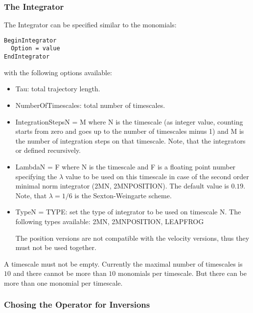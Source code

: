 \subsubsection{The Integrator}

The Integrator can be specified similar to the monomials:
\begin{verbatim}
BeginIntegrator
  Option = value
EndIntegrator
\end{verbatim}
with the following options available:
\begin{itemize}
\item {\ttfamily Tau}: total trajectory length.
\item {\ttfamily NumberOfTimescales}: total number of timescales.
\item {\ttfamily IntegrationStepsN = M} where {\ttfamily N} is the
  timescale (as integer value, counting starts from zero and goes up
  to the number of timescales minus 1) and {\ttfamily M} is the number
  of integration steps on that timescale. Note, that the integrators
  or defined recursively.
\item {\ttfamily LambdaN = F} where {\ttfamily N} is the
  timescale and {\ttfamily F} is a floating point number specifying
  the $\lambda$ value to be used on this timescale in case of the
  second order minimal norm integrator (2MN, 2MNPOSITION). The default
  value is $0.19$. Note, that $\lambda = 1/6$ is the Sexton-Weingarte
  scheme. 
\item {\ttfamily TypeN = TYPE}: set the type of integrator to be used
  on timescale {\ttfamily N}. The following types available:
  {\ttfamily 2MN, 2MNPOSITION, LEAPFROG}

  The position versions are not compatible with the velocity versions,
  thus they must not be used together.
\end{itemize}
A timescale must not be empty. Currently the maximal number of
timescales is $10$ and there cannot be more than $10$ monomials per
timescale. But there can be more than one monomial per timescale.

\subsubsection{Chosing the Operator for Inversions}

